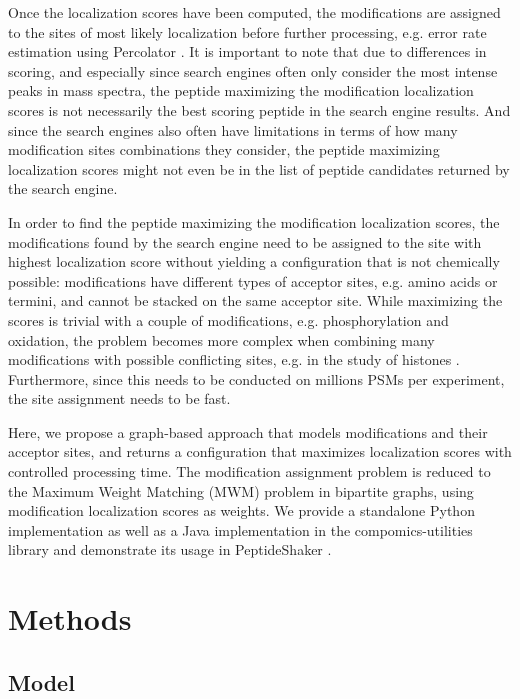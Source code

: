 \documentclass[]{article}
\begin{document}
Once the localization scores have been computed, the modifications are assigned to the sites of most likely localization before further processing, e.g. error rate estimation using Percolator \cite{Percolator}. It is important to note that due to differences in scoring, and especially since search engines often only consider the most intense peaks in mass spectra, the peptide maximizing the modification localization scores is not necessarily the best scoring peptide in the search engine results. And since the search engines also often have limitations in terms of how many modification sites combinations they consider, the peptide maximizing localization scores might not even be in the list of peptide candidates returned by the search engine.

In order to find the peptide maximizing the modification localization scores, the modifications found by the search engine need to be assigned to the site with highest localization score without yielding a configuration that is not chemically possible: modifications have different types of acceptor sites, e.g. amino acids or termini, and cannot be stacked on the same acceptor site. While maximizing the scores is trivial with a couple of modifications, e.g. phosphorylation and oxidation, the problem becomes more complex when combining many modifications with possible conflicting sites, e.g. in the study of histones \cite{Histone_study}. Furthermore, since this needs to be conducted on millions PSMs per experiment, the site assignment needs to be fast.

Here, we propose a graph-based approach that models modifications and their acceptor sites, and returns a configuration that maximizes localization scores with controlled processing time. The modification assignment problem is reduced to the Maximum Weight Matching (MWM) problem in bipartite graphs, using modification localization scores as weights. We provide a standalone Python implementation as well as a Java implementation in the compomics-utilities library \cite{compomics} and demonstrate its usage in PeptideShaker \cite{PeptideShaker}.

\section{Methods}

\subsection{Model}
\end{document}
